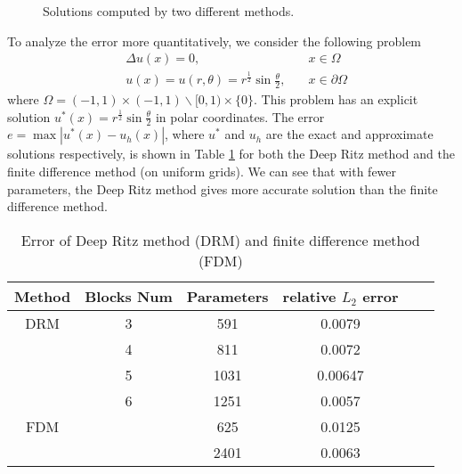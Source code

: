 \documentclass[a4paper,12pt]{article}
\begin{document}


\begin{figure}[!h]
\centering
\vspace{2pt}
\vspace{3pt}
\label{fig:01}
\caption{Solutions computed by two different methods.}
\end{figure}

To analyze the error more quantitatively, we consider the following
problem
\begin{equation}
\begin{aligned}
&\Delta u(x)=0,\quad &x\in \Omega\\
&u(x)=u(r,\theta)=r^{\frac{1}{2}}\sin\frac{\theta}{2},\quad &x\in \partial \Omega
\end{aligned}
\end{equation}
where $\Omega=(-1,1)\times (-1,1) \backslash [0,1)\times \{0\}$.
This problem has an explicit solution 
$u^*(x)=r^{\frac{1}{2}}\sin\frac{\theta}{2}$ in polar coordinates.
The error $e=\max |u^*(x)-u_h(x)|$, where $u^*$ and $u_h$ are the 
exact and approximate solutions respectively, is shown in Table \ref{tab:eq} for both the Deep Ritz method and the finite difference method (on uniform grids).
We can see that with fewer parameters, the Deep Ritz method 
gives more accurate solution than the finite difference method.

\begin{table}
\caption{Error of Deep Ritz method (DRM) and finite difference
method (FDM)}\label{tab:eq}
\begin{center}
\begin{tabular}{c|ccccc}
\hline
Method  & Blocks Num & Parameters & relative $L_2$ error \\ \hline
DRM & 3 & 591 & 0.0079\\ \hline
& 4 & 811 & 0.0072\\ \hline
& 5 & 1031 & 0.00647\\ \hline
& 6 & 1251 & 0.0057\\ \hline
FDM & & 625 & 0.0125\\ \hline
& & 2401 & 0.0063\\ \hline
\end{tabular}
\end{center}
\end{table}
\end{document}
